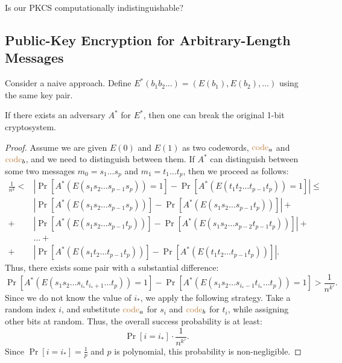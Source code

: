 \begin{exercise}
	Is our PKCS computationally indistinguishable?
\end{exercise}

\subsection{Public-Key Encryption for Arbitrary-Length Messages}

Consider a naive approach.
Define $E^*(b_1b_2\ldots) = (E(b_1), E(b_2), \ldots)$ using the same key pair.

\begin{lemma}
	If there exists an adversary $A^*$ for $E^*$, then one can break the original 1-bit cryptosystem.
\end{lemma}

\begin{proof}
	Assume we are given $E(0)$ and $E(1)$ as two codewords, $\textcolor{brown}{\text{code}}_a$ and $\textcolor{brown}{\text{code}}_b$, and we need to distinguish between them.
	If $A^*$ can distinguish between some two messages $m_0 = s_1 \ldots s_p$ and $m_1 = t_1 \ldots t_p$, then we proceed as follows:
	\begin{align*}
		\frac{1}{n^{k}} < &\left|\Pr[A^*(E(s_1s_2\ldots s_{p-1}s_p)) = 1] - \Pr[A^*(E(t_1t_2\ldots t_{p-1}t_p)) = 1]\right| \leq \\
						  &\left| \Pr[A^*(E(s_1s_2\ldots s_{p - 1} s_p))] - \Pr[A^*(E(s_1 s_2 \ldots s_{p - 1} t_p))] \right| + \\
						  +&\left| \Pr[A^*(E(s_1s_2\ldots s_{p - 1} t_p))] - \Pr[A^*(E(s_1 s_2 \ldots s_{p - 2} t_{p - 1} t_p))] \right| + \\
						  &\ldots + \\
						  +&\left| \Pr[A^*(E(s_1t_2\ldots t_{p - 1} t_p))] - \Pr[A^*(E(t_1 t_2 \ldots t_{p - 1} t_p))] \right|.
	\end{align*}
	Thus, there exists some pair with a substantial difference:
	\[
		\Pr[A^*(E(s_1s_2\ldots s_{i_*} t_{i_* + 1}\ldots t_p)) = 1] - \Pr[A^*(E(s_1s_2\ldots s_{i_* - 1} t_{i_*} \ldots t_p)) = 1] > \frac{1}{n^{k'}}.
	\] 
	Since we do not know the value of $i_*$, we apply the following strategy.
	Take a random index $i$, and substitute $\textcolor{brown}{\text{code}}_a$ for $s_{i}$ and $\textcolor{brown}{\text{code}}_b$ for $t_{i}$, while assigning other bits at random.
	Thus, the overall success probability is at least:
	\[
		\Pr[i = i_*] \cdot \frac{1}{n^{k'}}.
	\] 
	Since $\Pr[i = i_*] = \frac{1}{p}$ and $p$ is polynomial, this probability is non-negligible.
\end{proof}

